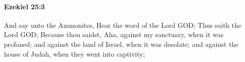 
		\paragraph{Ezekiel 25:3} %
			\label{EZEKIEL-25-3}

			And say unto the Ammonites, Hear the word of the Lord GOD; Thus saith the Lord GOD; Because thou saidst, Aha, against my sanctuary, when it was profaned; and against the land of Israel, when it was desolate; and against the house of Judah, when they went into captivity;


